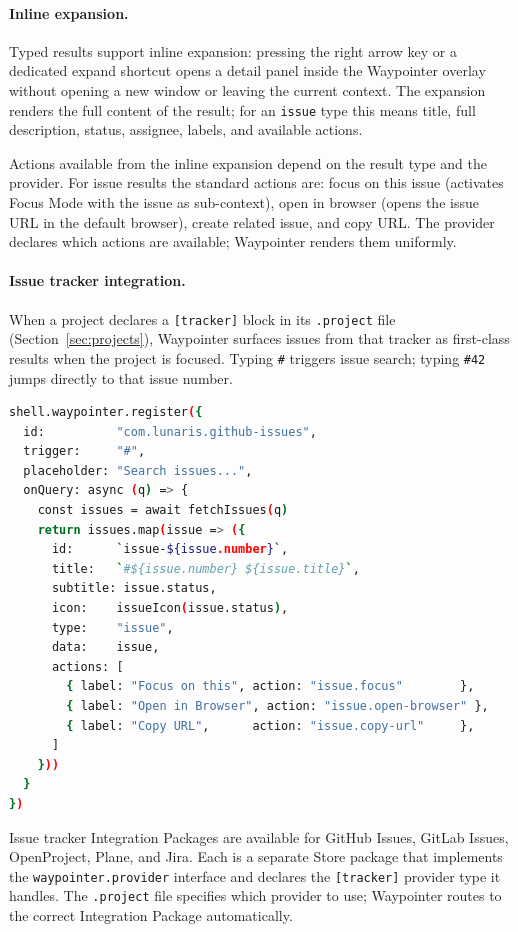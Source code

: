 \paragraph{Inline expansion.}
Typed results support inline expansion: pressing the right arrow key or a
dedicated expand shortcut opens a detail panel inside the Waypointer overlay
without opening a new window or leaving the current context. The expansion
renders the full content of the result; for an \texttt{issue} type this
means title, full description, status, assignee, labels, and available actions.

Actions available from the inline expansion depend on the result type and the
provider. For issue results the standard actions are: focus on this issue
(activates Focus Mode with the issue as sub-context), open in browser (opens
the issue URL in the default browser), create related issue, and copy URL.
The provider declares which actions are available; Waypointer renders them
uniformly.

\paragraph{Issue tracker integration.}
When a project declares a \texttt{[tracker]} block in its
\texttt{.project} file (Section~\ref{sec:projects}), Waypointer surfaces
issues from that tracker as first-class results when the project is focused.
Typing \texttt{\#} triggers issue search; typing \texttt{\#42} jumps directly
to that issue number.

\begin{lstlisting}[language=bash, caption={Issue provider registration via module SDK}]
shell.waypointer.register({
  id:          "com.lunaris.github-issues",
  trigger:     "#",
  placeholder: "Search issues...",
  onQuery: async (q) => {
    const issues = await fetchIssues(q)
    return issues.map(issue => ({
      id:      `issue-${issue.number}`,
      title:   `#${issue.number} ${issue.title}`,
      subtitle: issue.status,
      icon:    issueIcon(issue.status),
      type:    "issue",
      data:    issue,
      actions: [
        { label: "Focus on this", action: "issue.focus"        },
        { label: "Open in Browser", action: "issue.open-browser" },
        { label: "Copy URL",      action: "issue.copy-url"     },
      ]
    }))
  }
})
\end{lstlisting}

Issue tracker Integration Packages are available for GitHub Issues, GitLab
Issues, OpenProject, Plane, and Jira. Each is a separate Store package that
implements the \texttt{waypointer.provider} interface and declares the
\texttt{[tracker]} provider type it handles. The \texttt{.project} file
specifies which provider to use; Waypointer routes to the correct Integration
Package automatically.


